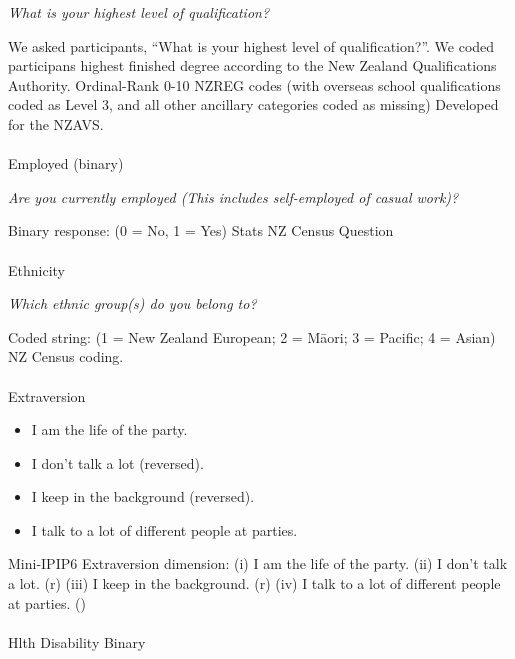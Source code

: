 \documentclass[
  single column]{article}
\makeatletter
\let\oldparagraph\paragraph
\renewcommand{\paragraph}{
    \@ifstar
      \xxxParagraphStar
      \xxxParagraphNoStar
  }
\newcommand{\xxxParagraphStar}[1]{\oldparagraph*{#1}\mbox{}}
\newcommand{\xxxParagraphNoStar}[1]{\oldparagraph{#1}\mbox{}}
\providecommand{\tightlist}{%
  \setlength{\itemsep}{0pt}\setlength{\parskip}{0pt}}\usepackage{longtable,booktabs,array}
\makeatother
\begin{document}
\emph{What is your highest level of qualification?}

We asked participants, ``What is your highest level of qualification?''.
We coded participans highest finished degree according to the New
Zealand Qualifications Authority. Ordinal-Rank 0-10 NZREG codes (with
overseas school qualifications coded as Level 3, and all other ancillary
categories coded as missing) Developed for the NZAVS.

\paragraph{Employed (binary)}\label{employed-binary}

\emph{Are you currently employed (This includes self-employed of casual
work)?}

Binary response: (0 = No, 1 = Yes) Stats NZ Census Question

\paragraph{Ethnicity}\label{ethnicity}

\emph{Which ethnic group(s) do you belong to?}

Coded string: (1 = New Zealand European; 2 = Māori; 3 = Pacific; 4 =
Asian) NZ Census coding.

\paragraph{Extraversion}\label{extraversion}

\begin{itemize}
\tightlist
\item
  I am the life of the party.
\item
  I don't talk a lot (reversed).
\item
  I keep in the background (reversed).
\item
  I talk to a lot of different people at parties.
\end{itemize}

Mini-IPIP6 Extraversion dimension: (i) I am the life of the party. (ii)
I don't talk a lot. (r) (iii) I keep in the background. (r) (iv) I talk
to a lot of different people at parties.
()

\paragraph{Hlth Disability Binary}\label{hlth-disability-binary}
\end{document}

